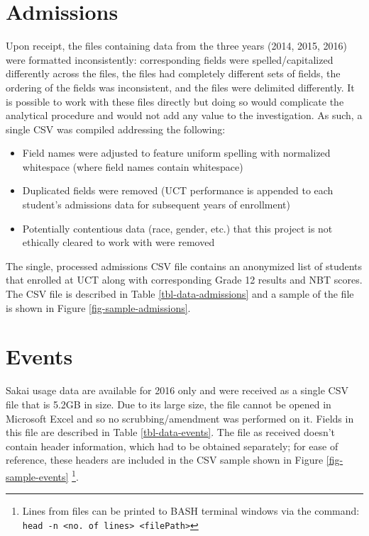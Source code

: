 \section{Admissions}
Upon receipt, the files containing data from the three years (2014, 2015, 2016) were formatted inconsistently: corresponding fields were spelled/capitalized differently across the files, the files had completely different sets of fields, the ordering of the fields was inconsistent, and the files were delimited differently. It is possible to work with these files directly but doing so would complicate the analytical procedure and would not add any value to the investigation. As such, a single CSV was compiled addressing the following:

\begin{itemize}
    \item Field names were adjusted to feature uniform spelling with normalized whitespace (where field names contain whitespace)
    \item Duplicated fields were removed (UCT performance is appended to each student's admissions data for subsequent years of enrollment)
    \item Potentially contentious data (race, gender, etc.) that this project is not ethically cleared to work with were removed
\end{itemize}

The single, processed admissions CSV file contains an anonymized list of students that enrolled at UCT along with corresponding Grade 12 results and NBT scores. The CSV file is described in Table \ref{tbl-data-admissions} and a sample of the file is shown in Figure \ref{fig-sample-admissions}.

\section{Events}
Sakai usage data are available for 2016 only and were received as a single CSV file that is 5.2GB in size. Due to its large size, the file cannot be opened in Microsoft Excel and so no scrubbing/amendment was performed on it. Fields in this file are described in Table \ref{tbl-data-events}. The file as received doesn't contain header information, which had to be obtained separately; for ease of reference, these headers are included in the CSV sample shown in Figure \ref{fig-sample-events} \footnote{Lines from files can be printed to BASH terminal windows via the command: \texttt{head -n <no. of lines> <filePath>}}.





